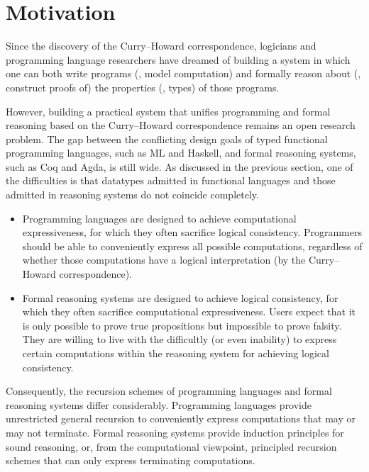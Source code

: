 \section{Motivation}\label{sec:intro:motiv}
Since the discovery of the Curry--Howard correspondence, logicians and
programming language researchers have dreamed of building a system in which
one can both write programs (\ie, model computation) and formally reason about
(\ie, construct proofs of) the properties (\ie, types) of those programs.

However, building a practical system that unifies programming and
formal reasoning based on the Curry--Howard correspondence remains
an open research problem. The gap between the conflicting design goals of
typed functional programming languages, such as ML and Haskell, and
formal reasoning systems, such as Coq and Agda, is still wide.
As discussed in the previous section, one of the difficulties is
that datatypes admitted in functional languages and those admitted
in reasoning systems do not coincide completely.

\begin{itemize}

\item
Programming languages are designed to achieve computational expressiveness,
for which they often sacrifice logical consistency.
Programmers should be able to conveniently express all possible computations,
regardless of whether those computations have a logical interpretation
(by the Curry--Howard correspondence).

\item
Formal reasoning systems are designed to achieve logical consistency,
for which they often sacrifice computational expressiveness.
Users expect that it is only possible to prove true propositions
but impossible to prove falsity. They are willing to live with
the difficultly (or even inability) to express certain computations
within the reasoning system for achieving logical consistency.

\end{itemize}

Consequently, the recursion schemes of programming languages and
formal reasoning systems differ considerably.
Programming languages provide unrestricted general recursion
to conveniently express computations that may or may not terminate.
Formal reasoning systems provide induction principles for sound reasoning,
or, from the computational viewpoint, principled recursion schemes that can only
express terminating computations.

